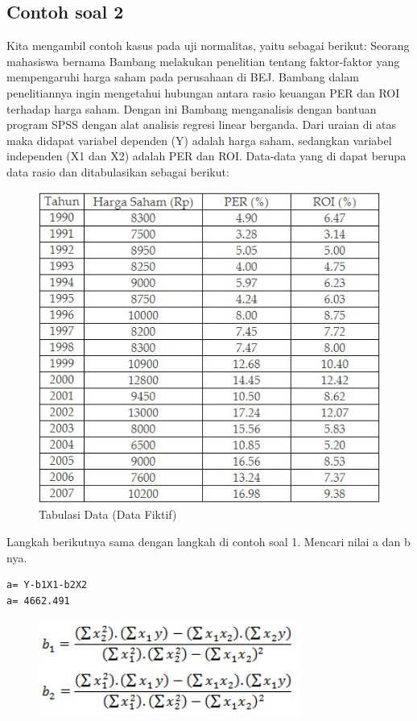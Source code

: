 \subsection{Contoh soal 2}
\par Kita mengambil contoh kasus pada uji normalitas, yaitu sebagai berikut: Seorang mahasiswa bernama Bambang melakukan penelitian tentang faktor-faktor yang mempengaruhi harga saham pada perusahaan di BEJ.\citep{priyatno2014spss} Bambang dalam penelitiannya ingin mengetahui hubungan antara rasio keuangan PER dan ROI terhadap harga saham. Dengan ini Bambang menganalisis dengan bantuan program SPSS dengan alat analisis regresi linear berganda. Dari uraian di atas maka didapat variabel dependen (Y) adalah harga saham, sedangkan variabel independen (X1 dan X2) adalah PER dan ROI.
Data-data yang di dapat berupa data rasio dan ditabulasikan sebagai berikut: \begin{figure}[!htbp]
    \centering
    \includegraphics[scale=0.7]{figures/cs.JPG}
    \caption{Tabulasi Data (Data Fiktif)}
\end{figure}
\newpage \par Langkah berikutnya sama dengan langkah di contoh soal 1. Mencari nilai a dan b nya. \begin{lstlisting}
a= Y-b1X1-b2X2      
a= 4662.491
\end{lstlisting}
\begin{figure}[!htbp]
\includegraphics[scale=0.6]{figures/b1b2.JPG}
    \label{Figure4}
\end{figure}

